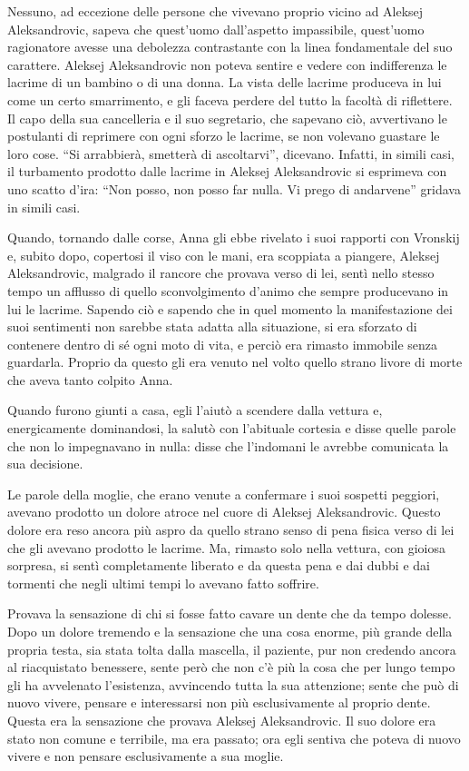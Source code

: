 \label{xiii-2} 

Nessuno, ad eccezione delle persone che vivevano proprio vicino ad Aleksej Aleksandrovic, sapeva che quest'uomo dall'aspetto impassibile, quest'uomo ragionatore avesse una debolezza contrastante con la linea fondamentale del suo carattere. Aleksej Aleksandrovic non poteva sentire e vedere con indifferenza le lacrime di un bambino o di una donna. La vista delle lacrime produceva in lui come un certo smarrimento, e gli faceva perdere del tutto la facoltà di riflettere. Il capo della sua cancelleria e il suo segretario, che sapevano ciò, avvertivano le postulanti di reprimere con ogni sforzo le lacrime, se non volevano guastare le loro cose. ``Si arrabbierà, smetterà di ascoltarvi'', dicevano. Infatti, in simili casi, il turbamento prodotto dalle lacrime in Aleksej Aleksandrovic si esprimeva con uno scatto d'ira: ``Non posso, non posso far nulla. Vi prego di andarvene'' gridava in simili casi. 

Quando, tornando dalle corse, Anna gli ebbe rivelato i suoi rapporti con Vronskij e, subito dopo, copertosi il viso con le mani, era scoppiata a piangere, Aleksej Aleksandrovic, malgrado il rancore che provava verso di lei, sentì nello stesso tempo un afflusso di quello sconvolgimento d'animo che sempre producevano in lui le lacrime. Sapendo ciò e sapendo che in quel momento la manifestazione dei suoi sentimenti non sarebbe stata adatta alla situazione, si era sforzato di contenere dentro di sé ogni moto di vita, e perciò era rimasto immobile senza guardarla. Proprio da questo gli era venuto nel volto quello strano livore di morte che aveva tanto colpito Anna. 

Quando furono giunti a casa, egli l'aiutò a scendere dalla vettura e, energicamente dominandosi, la salutò con l'abituale cortesia e disse quelle parole che non lo impegnavano in nulla: disse che l'indomani le avrebbe comunicata la sua decisione. 

Le parole della moglie, che erano venute a confermare i suoi sospetti peggiori, avevano prodotto un dolore atroce nel cuore di Aleksej Aleksandrovic. Questo dolore era reso ancora più aspro da quello strano senso di pena fisica verso di lei che gli avevano prodotto le lacrime. Ma, rimasto solo nella vettura, con gioiosa sorpresa, si sentì completamente liberato e da questa pena e dai dubbi e dai tormenti che negli ultimi tempi lo avevano fatto soffrire. 

Provava la sensazione di chi si fosse fatto cavare un dente che da tempo dolesse. Dopo un dolore tremendo e la sensazione che una cosa enorme, più grande della propria testa, sia stata tolta dalla mascella, il paziente, pur non credendo ancora al riacquistato benessere, sente però che non c'è più la cosa che per lungo tempo gli ha avvelenato l'esistenza, avvincendo tutta la sua attenzione; sente che può di nuovo vivere, pensare e interessarsi non più esclusivamente al proprio dente. Questa era la sensazione che provava Aleksej Aleksandrovic. Il suo dolore era stato non comune e terribile, ma era passato; ora egli sentiva che poteva di nuovo vivere e non pensare esclusivamente a sua moglie. 

